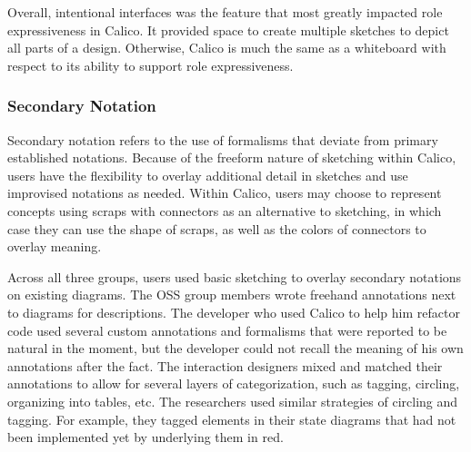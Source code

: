 Overall, intentional interfaces was the feature that most greatly impacted role expressiveness in Calico. It provided space to create multiple sketches to depict all parts of a design. Otherwise, Calico is much the same as a whiteboard with respect to its ability to support role expressiveness.

%

\subsubsection{Secondary Notation}

Secondary notation refers to the use of formalisms that deviate from primary established notations. Because of the freeform nature of sketching within Calico, users have the flexibility to overlay additional detail in sketches and use improvised notations as needed. Within Calico, users may choose to represent concepts using scraps with connectors as an alternative to sketching, in which case they can use the shape of scraps, as well as the colors of connectors to overlay meaning.

Across all three groups, users used basic sketching to overlay secondary notations on existing diagrams. The OSS group members wrote freehand annotations next to diagrams for descriptions. The developer who used Calico to help him refactor code used several custom annotations and formalisms that were reported to be natural in the moment, but the developer could not recall the meaning of his own annotations after the fact. The interaction designers mixed and matched their annotations to allow for several layers of categorization, such as tagging, circling, organizing into tables, etc. The researchers used similar strategies of circling and tagging. For example, they tagged elements in their state diagrams that had not been implemented yet by underlying them in red. 

